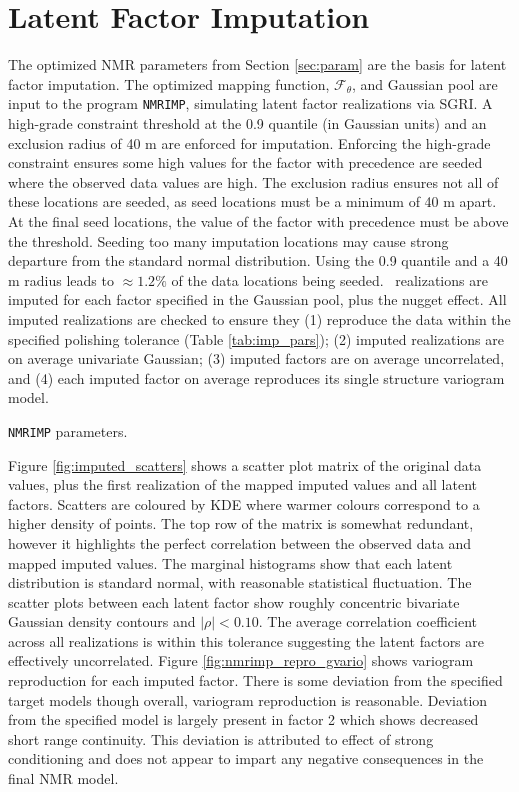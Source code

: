\FloatBarrier
\section{Latent Factor Imputation}
\label{sec:fact_imp}

The optimized \gls{NMR} parameters from Section \ref{sec:param} are the basis for latent factor imputation. The optimized mapping function, $\mathcal{F}_{\theta}$, and Gaussian pool are input to the program \texttt{NMRIMP}, simulating latent factor realizations via \gls{SGRI}. A high-grade constraint threshold at the 0.9 quantile (in Gaussian units) and an exclusion radius of 40 m are enforced for imputation. Enforcing the high-grade constraint ensures some high values for the factor with precedence are seeded where the observed data values are high. The exclusion radius ensures not all of these locations are seeded, as seed locations must be a minimum of 40 m apart. At the final seed locations, the value of the factor with precedence must be above the threshold. Seeding too many imputation locations may cause strong departure from the standard normal distribution. Using the 0.9 quantile and a 40 m radius leads to $\approx 1.2\%$ of the data locations being seeded. \csnreals \ realizations are imputed for each factor specified in the Gaussian pool, plus the nugget effect. All imputed realizations are checked to ensure they (1) reproduce the data within the specified polishing tolerance (Table \ref{tab:imp_pars}); (2) imputed realizations are on average univariate Gaussian; (3) imputed factors are on average uncorrelated, and (4) each imputed factor on average reproduces its single structure variogram model.

\begin{table}[!htb]
    \centering
    \caption{\texttt{NMRIMP} parameters.}
    \resizebox{0.9\width}{!}{}
    \label{tab:imp_pars}
\end{table}

Figure \ref{fig:imputed_scatters} shows a scatter plot matrix of the original data values, plus the first realization of the mapped imputed values and all latent factors. Scatters are coloured by \gls{KDE} where warmer colours correspond to a higher density of points. The top row of the matrix is somewhat redundant, however it highlights the perfect correlation between the observed data and mapped imputed values. The marginal histograms show that each latent distribution is standard normal, with reasonable statistical fluctuation. The scatter plots between each latent factor show roughly concentric bivariate Gaussian density contours and $|\rho| < 0.10$. The average correlation coefficient across all realizations is within this tolerance suggesting the latent factors are effectively uncorrelated. Figure \ref{fig:nmrimp_repro_gvario} shows variogram reproduction for each imputed factor. There is some deviation from the specified target models though overall, variogram reproduction is reasonable. Deviation from the specified model is largely present in factor 2 which shows decreased short range continuity. This deviation is attributed to effect of strong conditioning and does not appear to impart any negative consequences in the final \gls{NMR} model.

